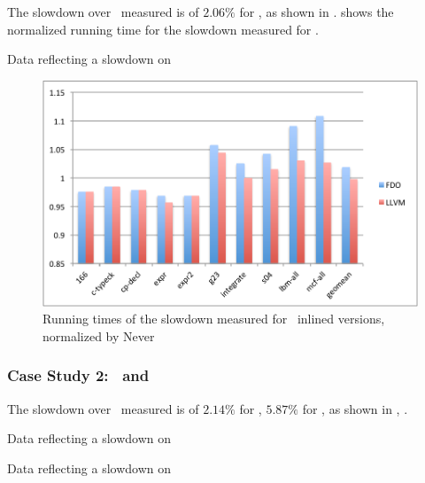 The slowdown over \llvm\ measured is of $2.06 \%$ for \gcc, as shown in .  shows the normalized running time for the slowdown measured for \gcc.

\begin{table}
  \centering
  \begin{tiny}
  
  \end{tiny}
  \caption{Data reflecting a slowdown on \gcc}
  \label{tab:slowdowngcc}
\end{table}

\begin{figure}
  \centering
  \includegraphics[width=1.00\linewidth]{Figures/slowdowngcc}
  \caption{Running times of the slowdown measured for \gcc\ inlined versions, normalized by Never}
  \label{fig:slowdowngcc}
\end{figure}

\subsubsection{Case Study 2: \bzip\  and \gzip}

The slowdown over \llvm\ measured is of $2.14 \%$ for \bzip, $5.87 \%$ for \gzip, as shown in , .

\begin{table}
  \centering
  \begin{tiny}
  
  \end{tiny}
  \caption{Data reflecting a slowdown on \bzip}
  \label{tab:slowdownb}
\end{table}

\begin{table}
  \centering
  \begin{tiny}
  
  \end{tiny}
  \caption{Data reflecting a slowdown on \gzip}
  \label{tab:slowdownz}
\end{table}

